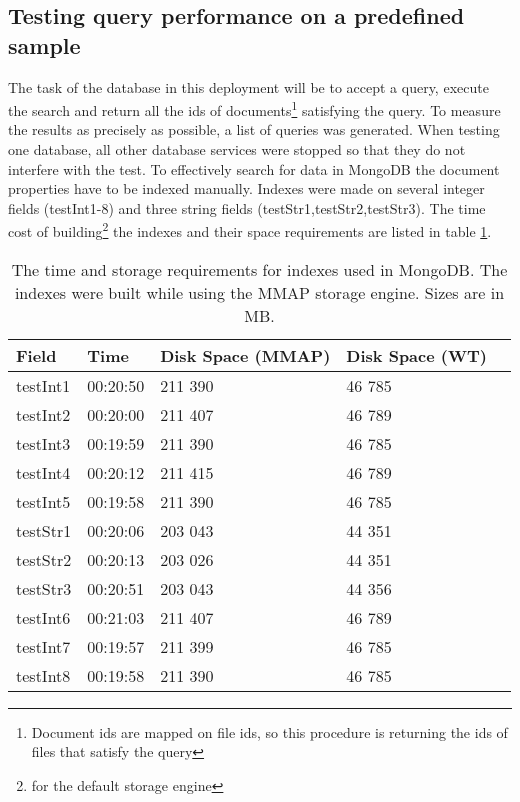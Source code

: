 \subsection{Testing query performance on a predefined sample}

The task of the database in this deployment will be to accept a query, execute the search and return all the 
ids of documents\footnote{Document ids are mapped on file ids, so this procedure is returning the ids of files
that satisfy the query} satisfying the query. To measure the results as precisely as possible, a list of
queries was generated. When testing one database, all other database services were stopped so that they do not
interfere with the test. To effectively search for data in MongoDB the document properties have to be 
indexed manually. Indexes were made on several integer fields (testInt1-8) and three string fields 
(testStr1,testStr2,testStr3). The time cost of building\footnote{for the default storage engine} the 
indexes and their space requirements are listed in table \ref{tab:indexBuildTimes}.

\begin{table}[h]
\centering
\label{tab:indexBuildTimes}
\begin{tabular}{|l|l|l|l|l|}
\hline
Field    & Time     & Disk Space (MMAP) & Disk Space (WT) \\ \hline
testInt1 & 00:20:50 & 211 390           & 46 785          \\ \hline
testInt2 & 00:20:00 & 211 407           & 46 789          \\ \hline
testInt3 & 00:19:59 & 211 390           & 46 785          \\ \hline
testInt4 & 00:20:12 & 211 415           & 46 789          \\ \hline
testInt5 & 00:19:58 & 211 390           & 46 785          \\ \hline
testStr1 & 00:20:06 & 203 043           & 44 351          \\ \hline
testStr2 & 00:20:13 & 203 026           & 44 351          \\ \hline
testStr3 & 00:20:51 & 203 043           & 44 356          \\ \hline
testInt6 & 00:21:03 & 211 407           & 46 789          \\ \hline
testInt7 & 00:19:57 & 211 399           & 46 785          \\ \hline
testInt8 & 00:19:58 & 211 390           & 46 785          \\ \hline
\end{tabular}
\caption{The time and storage requirements for indexes used in MongoDB. The indexes were built while using
the MMAP storage engine. Sizes are in MB.}
\end{table}

